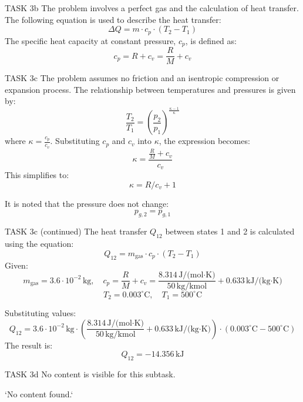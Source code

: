 TASK 3b  
The problem involves a perfect gas and the calculation of heat transfer. The following equation is used to describe the heat transfer:  
\[
\Delta Q = m \cdot c_p \cdot (T_2 - T_1)
\]  
The specific heat capacity at constant pressure, \( c_p \), is defined as:  
\[
c_p = R + c_v = \frac{R}{M} + c_v
\]  

TASK 3c  
The problem assumes no friction and an isentropic compression or expansion process. The relationship between temperatures and pressures is given by:  
\[
\frac{T_2}{T_1} = \left( \frac{p_2}{p_1} \right)^{\frac{\kappa - 1}{\kappa}}
\]  
where \( \kappa = \frac{c_p}{c_v} \). Substituting \( c_p \) and \( c_v \) into \( \kappa \), the expression becomes:  
\[
\kappa = \frac{\frac{R}{M} + c_v}{c_v}
\]  
This simplifies to:  
\[
\kappa = R/c_v + 1
\]  

It is noted that the pressure does not change:  
\[
p_{g,2} = p_{g,1}
\]  

TASK 3c (continued)  
The heat transfer \( Q_{12} \) between states 1 and 2 is calculated using the equation:  
\[
Q_{12} = m_{\text{gas}} \cdot c_p \cdot (T_2 - T_1)
\]  
Given:  
\[
m_{\text{gas}} = 3.6 \cdot 10^{-2} \, \text{kg}, \quad c_p = \frac{R}{M} + c_v = \frac{8.314 \, \text{J/(mol·K)}}{50 \, \text{kg/kmol}} + 0.633 \, \text{kJ/(kg·K)}
\]  
\[
T_2 = 0.003^\circ\text{C}, \quad T_1 = 500^\circ\text{C}
\]  

Substituting values:  
\[
Q_{12} = 3.6 \cdot 10^{-2} \, \text{kg} \cdot \left( \frac{8.314 \, \text{J/(mol·K)}}{50 \, \text{kg/kmol}} + 0.633 \, \text{kJ/(kg·K)} \right) \cdot (0.003^\circ\text{C} - 500^\circ\text{C})
\]  
The result is:  
\[
Q_{12} = -14.356 \, \text{kJ}
\]  

TASK 3d  
No content is visible for this subtask.  

`No content found.`